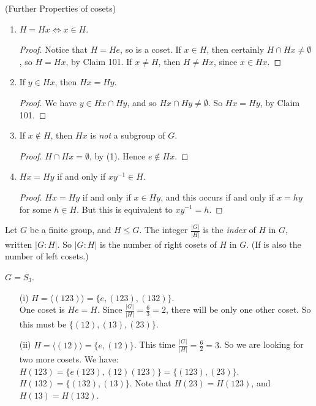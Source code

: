 \documentclass[10pt]{scrartcl}
\begin{document}
\begin{remarks} (Further Properties of cosets) \begin{enumerate}
 \item  $H = Hx \iff x \in H$.\begin{proof}
Notice that $H = He$, so is a coset. If $x \in H$, then certainly $H \cap Hx \neq \emptyset$, so $H = Hx$, by Claim 101.	If $x \neq H$, then $H \neq Hx$, since $x \in Hx$.
\end{proof}
\item If $y \in Hx$, then $Hx = Hy$. \begin{proof}
 We have $y \in Hx \cap Hy$, and so $Hx \cap Hy \neq \emptyset$. So $Hx = Hy$, by Claim 101.	
 \end{proof}
 
 \item If $x \not\in H$, then $Hx$ is \emph{not} a subgroup of $G$. \begin{proof}
 	$H \cap Hx = \emptyset$, by (1). Hence $e \not\in Hx$. 
 \end{proof}

\item $Hx = Hy$ if and only if $xy^{-1} \in H$.\begin{proof}
$Hx = Hy$ if and only if $x \in Hy$, and this occurs if and only if $x = hy$ for some $h \in H$. But this is equivalent to $xy^{-1} = h$.	
\end{proof}
 \end{enumerate}
 \end{remarks} \vspace*{10pt}

\begin{definition} Let $G$ be a finite group, and $H \leq G$. The integer $\frac{|G|}{|H|}$ is the \emph{index} of $H$ in $G$, written $|G : H|$. So $|G:H|$ is the number of right cosets of $H$ in $G$. (If is also the number of left cosets.)	
\end{definition}\vspace*{10pt}


\begin{examples} $G = S_3$. \begin{enumerate}
 \item[(i)] $H = \langle (123) \rangle = \{e,(123),(132)\}$.\\[-0.3cm]
 
 One coset is $He = H$. Since $\frac{|G|}{|H|} = \frac{6}{3} = 2$, there will be only one other coset. So this must be $\{(12),(13),(23)\}$.
 
 \item[(ii)] $H = \langle (12) \rangle = \{e,(12)\}$. This time $\frac{|G|}{|H|} = \frac{6}{2} = 3$. So we are looking for two more cosets. We have:\\[-0.3cm]
 
  $H(123) = \{e(123),(12)(123)\} = \{(123),(23)\}$.\\
   $H(132) = \{(132),(13)\}$. Note that $H(23) = H(123)$, and $H(13) = H(132)$.
 \end{enumerate}
 \end{examples}\vspace*{5pt}
 
\end{document}

